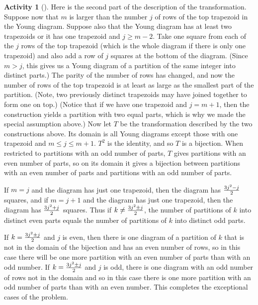 \documentclass[10pt,]{book}
\theoremstyle{plain}
\theoremstyle{definition}
\newtheorem{activity}[project]{Activity}
\numberwithin{equation}{chapter}
\begin{document}
\begin{activity}[]
Here is the second part of the description of the transformation. Suppose now that \(m\) is larger than the number \(j\) of rows of the top trapezoid in the Young diagram. Suppose also that the Young diagram has at least two trapezoids or it has one trapezoid and \(j\ge m-2\). Take one square from each of the \(j\) rows of the top trapezoid (which is the whole diagram if there is only one trapezoid) and also add a row of \(j\) squares at the bottom of the diagram. (Since \(m>j\), this gives us a Young diagram of a partition of the same integer into distinct parts.) The parity of the number of rows has changed, and now the number of rows of the top trapezoid is at least as large as the smallest part of the partition. (Note, two previously distinct trapezoids may have joined together to form one on top.) (Notice that if we have one trapezoid and \(j= m+1\), then the construction yields a partition with two equal parts, which is why we made the special assumption above.) Now let \(T\) be the transformation described by the two constructions above. Its domain is all Young diagrams except those with one trapezoid and \(m\le j\le m+1\). \(T^2\) is the identity, and so \(T\) is a bijection. When restricted to partitions with an odd number of parts, \(T\) gives partitions with an even number of parts, so on its domain it gives a bijection between partitions with an even number of parts and partitions with an odd number of parts.%
\par
If \(m=j\) and the diagram has just one trapezoid, then the diagram has \(3j^2-j\over 2\) squares, and if \(m=j+1\) and the diagram has just one trapezoid, then the diagram has \(3j^2+j\over 2\) squares. Thus if \(k\ne {3j^2\pm j\over 2}\), the number of partitions of \(k\) into distinct even parts equals the number of partitions of \(k\) into distinct odd parts.%
\par
If \(k= {3j^2\pm j\over 2}\) and \(j\) is even, then there is one diagram of a partition of \(k\) that is not in the domain of the bijection and has an even number of rows, so in this case there will be one more partition with an even number of parts than with an odd number. If \(k=
{3j^2\pm j\over 2}\) and \(j\) is odd, there is one diagram with an odd number of rows not in the domain and so in this case there is one more partition with an odd number of parts than with an even number. This completes the exceptional cases of the problem.%
\end{activity}
\typeout{************************************************}
\typeout{************************************************}
\end{document}

